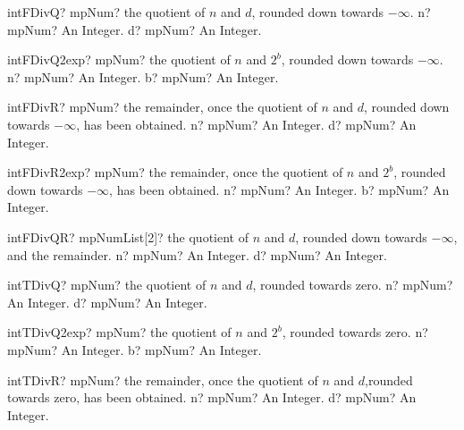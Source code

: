 \documentclass[12pt,a4paper,openany]{book}
\begin{document}
\begin{mpFunctionsExtract}
\mpFunctionTwo
{intFDivQ? mpNum? the quotient of $n$ and $d$, rounded down towards $-\infty$.}
{n? mpNum? An Integer.}
{d? mpNum? An Integer.}
\end{mpFunctionsExtract}

\begin{mpFunctionsExtract}
\mpFunctionTwo
{intFDivQ2exp? mpNum? the quotient of $n$ and $2^b$, rounded down towards $-\infty$.}
{n? mpNum? An Integer.}
{b? mpNum? An Integer.}
\end{mpFunctionsExtract}

\begin{mpFunctionsExtract}
\mpFunctionTwo
{intFDivR? mpNum? the remainder, once the quotient of $n$ and $d$, rounded down towards $-\infty$, has been obtained.}
{n? mpNum? An Integer.}
{d? mpNum? An Integer.}
\end{mpFunctionsExtract}

\begin{mpFunctionsExtract}
\mpFunctionTwo
{intFDivR2exp? mpNum? the remainder, once the quotient of $n$ and $2^b$, rounded down towards $-\infty$, has been obtained.}
{n? mpNum? An Integer.}
{b? mpNum? An Integer.}
\end{mpFunctionsExtract}

\begin{mpFunctionsExtract}
\mpFunctionTwo
{intFDivQR? mpNumList[2]? the quotient of $n$ and $d$, rounded down towards $-\infty$, and the remainder.}
{n? mpNum? An Integer.}
{d? mpNum? An Integer.}
\end{mpFunctionsExtract}

\begin{mpFunctionsExtract}
\mpFunctionTwo
{intTDivQ? mpNum? the quotient of $n$ and $d$, rounded towards zero.}
{n? mpNum? An Integer.}
{d? mpNum? An Integer.}
\end{mpFunctionsExtract}

\begin{mpFunctionsExtract}
\mpFunctionTwo
{intTDivQ2exp? mpNum? the quotient of $n$ and $2^b$, rounded towards zero.}
{n? mpNum? An Integer.}
{b? mpNum? An Integer.}
\end{mpFunctionsExtract}

\begin{mpFunctionsExtract}
\mpFunctionTwo
{intTDivR? mpNum? the remainder, once the quotient of $n$ and $d$,rounded towards zero, has been obtained.}
{n? mpNum? An Integer.}
{d? mpNum? An Integer.}
\end{mpFunctionsExtract}
\end{document}
